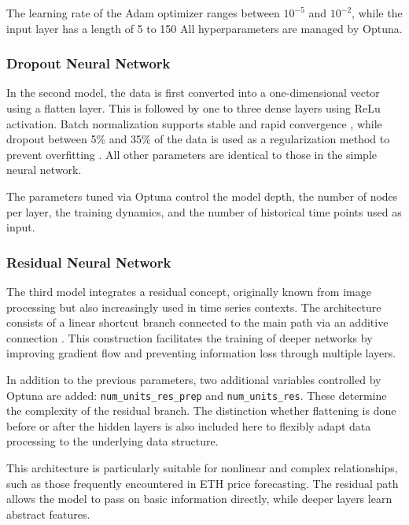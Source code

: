 The learning rate of the Adam optimizer ranges between $10^{-5}$ and $10^{-2}$, while the input layer has a length of 5 to 150
All hyperparameters are managed by Optuna.



\subsubsection{Dropout Neural Network}

In the second model, the data is first converted into a one-dimensional vector using a flatten layer.
This is followed by one to three dense layers using ReLu activation.
Batch normalization supports stable and rapid convergence \cite{batch-normalization}, while dropout between 5\% and 35\% of the data is used as a regularization method to prevent overfitting \cite{keras-dropout}.
All other parameters are identical to those in the simple neural network.

The parameters tuned via Optuna control the model depth, the number of nodes per layer, the training dynamics, and the number of historical time points used as input.



\subsubsection{Residual Neural Network}

The third model integrates a residual concept, originally known from image processing but also increasingly used in time series contexts.
The architecture consists of a linear shortcut branch connected to the main path via an additive connection \cite{residual-nn}.
This construction facilitates the training of deeper networks by improving gradient flow and preventing information loss through multiple layers.

In addition to the previous parameters, two additional variables controlled by Optuna are added: \verb|num_units_res_prep| and \verb|num_units_res|.
These determine the complexity of the residual branch.
The distinction whether flattening is done before or after the hidden layers is also included here to flexibly adapt data processing to the underlying data structure.

This architecture is particularly suitable for nonlinear and complex relationships, such as those frequently encountered in ETH price forecasting.
The residual path allows the model to pass on basic information directly, while deeper layers learn abstract features.

